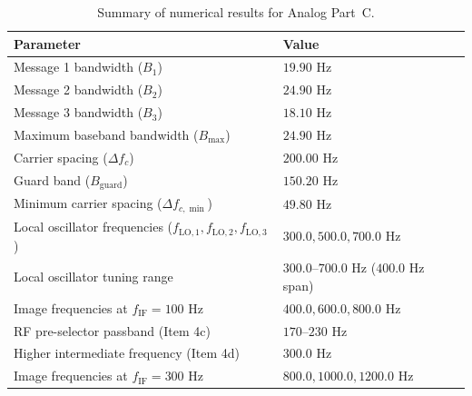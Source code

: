 \documentclass[a4paper]{article}
\begin{document}
\begin{table}[H]
    \centering
    \caption{Summary of numerical results for Analog Part~C.}
    \label{tab:part_c_summary}
    \begin{tabular}{ll}
        \hline
        \textbf{Parameter} & \textbf{Value} \\
        \hline
        
        Message 1 bandwidth ($B_1$) & $19.90\text{ Hz}$ \\
        Message 2 bandwidth ($B_2$) & $24.90\text{ Hz}$ \\
        Message 3 bandwidth ($B_3$) & $18.10\text{ Hz}$ \\
        Maximum baseband bandwidth ($B_{\max}$) & $24.90\text{ Hz}$ \\
        
        Carrier spacing ($\Delta f_c$) & $200.00\text{ Hz}$ \\
        Guard band ($B_{\text{guard}}$) & $150.20\text{ Hz}$ \\
        Minimum carrier spacing ($\Delta f_{c,\min}$) & $49.80\text{ Hz}$ \\
        
        Local oscillator frequencies ($f_{\text{LO},1}, f_{\text{LO},2}, f_{\text{LO},3}$) & $300.0, 500.0, 700.0\text{ Hz}$ \\
        Local oscillator tuning range & $300.0\text{--}700.0\text{ Hz}$ ($400.0\text{ Hz}$ span) \\
        Image frequencies at $f_{\text{IF}} = 100\text{ Hz}$ & $400.0, 600.0, 800.0\text{ Hz}$ \\
       
        RF pre-selector passband (Item 4c) & $170\text{--}230\text{ Hz}$ \\
        Higher intermediate frequency (Item 4d) & $300.0\text{ Hz}$ \\
        Image frequencies at $f_{\text{IF}} = 300\text{ Hz}$ & $800.0, 1000.0, 1200.0\text{ Hz}$ \\
        \hline
    \end{tabular}
\end{table}
\end{document}
